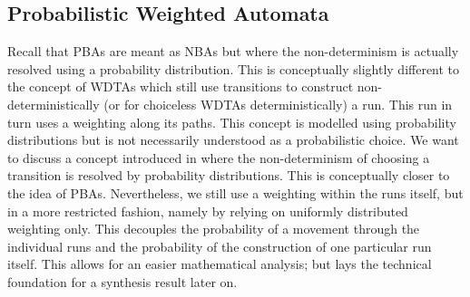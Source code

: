 \subsection{Probabilistic Weighted Automata}
Recall that \acp{PBA} are meant as \acp{NBA} but where the non-determinism is
actually resolved using a probability distribution. This is conceptually 
slightly different to the concept of \acp{WDTA} which still use transitions to
construct non-deterministically (or for choiceless \acp{WDTA} 
deterministically) a run. This run in turn uses a weighting along its paths. 
This concept is modelled using probability distributions but is not necessarily
understood as a probabilistic choice. We want to discuss a concept introduced
in \cite[Chapter 4]{RandAutoInfTrees} where the non-determinism of choosing a
transition is resolved by probability distributions. This is conceptually 
closer to the idea of \acp{PBA}. Nevertheless, we still use a weighting within
the runs itself, but in a more restricted fashion, namely by relying on 
uniformly distributed weighting only. This decouples the probability of a 
movement through the individual runs and the probability of the construction of 
one particular run itself. This allows for an easier mathematical analysis; but
lays the technical foundation for a synthesis result later on.

